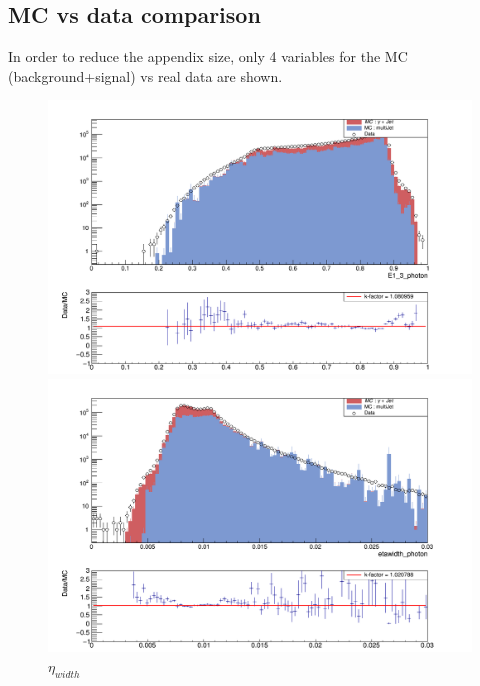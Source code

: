 \documentclass[11pt,a4paper]{report}
\theoremstyle{break}
\begin{document}
\begin{appendix}
	\chapter{MC vs data comparison}

In order to reduce the appendix size, only 4 variables for the MC (background+signal) vs real data are shown.

\begin{figure}[h!]
    \begin{minipage}[b]{0.5\linewidth}
    \includegraphics[width=1\textwidth]{E1_3_photon}
    \caption{$E_{1x3}/E_{5x5}$}
    \end{minipage}
    \begin{minipage}[b]{0.5\linewidth}
    \includegraphics[width=1\textwidth]{etawidth_photon}
    \caption{$\eta_{width}$}
    \end{minipage}
    \begin{minipage}[b]{0.5\linewidth}

\end{minipage}
\end{figure}
\end{appendix}
\end{document}
